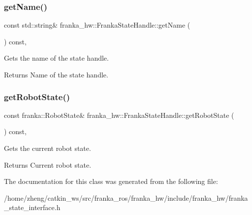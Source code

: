 \subsubsection{\texorpdfstring{get\+Name()}{getName()}}
{\footnotesize\ttfamily const std\+::string\& franka\+\_\+hw\+::\+Franka\+State\+Handle\+::get\+Name (\begin{DoxyParamCaption}{ }\end{DoxyParamCaption}) const\hspace{0.3cm}{\ttfamily [inline]}, {\ttfamily [noexcept]}}

Gets the name of the state handle.

\begin{DoxyReturn}{Returns}
Name of the state handle. 
\end{DoxyReturn}
\mbox{\label{classfranka__hw_1_1_franka_state_handle_a6e0be7a9ae6e86394ea273f9a84c11cb}} 
\subsubsection{\texorpdfstring{get\+Robot\+State()}{getRobotState()}}
{\footnotesize\ttfamily const franka\+::\+Robot\+State\& franka\+\_\+hw\+::\+Franka\+State\+Handle\+::get\+Robot\+State (\begin{DoxyParamCaption}{ }\end{DoxyParamCaption}) const\hspace{0.3cm}{\ttfamily [inline]}, {\ttfamily [noexcept]}}

Gets the current robot state.

\begin{DoxyReturn}{Returns}
Current robot state. 
\end{DoxyReturn}


The documentation for this class was generated from the following file\+:\begin{DoxyCompactItemize}
\item 
/home/zheng/catkin\+\_\+ws/src/franka\+\_\+ros/franka\+\_\+hw/include/franka\+\_\+hw/franka\+\_\+state\+\_\+interface.\+h\end{DoxyCompactItemize}
